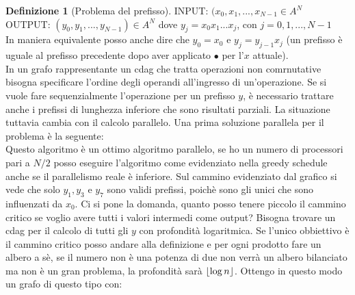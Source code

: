 \documentclass[a4paper,portrait,12pt]{article}
\theoremstyle{definition}
\newtheorem{definition}{Definizione}[section]
\DeclarePairedDelimiter{\floor}{\lfloor}{\rfloor}
\begin{document}
\begin{definition}[Problema del prefisso]
INPUT: $(x_0,x_1,...,x_{N-1} \in A^N$\\
OUTPUT: $(y_0,y_1,...,y_{N-1}) \in A^N$ dove $y_j = x_0x_1...x_j$, con $j=0,1,...,N-1$\\
In maniera equivalente posso anche dire che $y_0 = x_0$ e $y_j = y_{j-1}x_j$ (un prefisso è uguale al prefisso precedente dopo aver applicato $\bullet$ per l'$x$ attuale).\\

In un grafo rappresentante un cdag che tratta operazioni non comrnutative bisogna specificare l’ordine degli operandi all’ingresso di un’operazione.
Se si vuole fare sequenzialmente l’operazione per un prefisso $y$, è necessario trattare anche i prefissi di lunghezza inferiore che sono risultati parziali.
La situazione tuttavia cambia con il calcolo parallelo.
Una prima soluzione parallela per il problema è la seguente:\\

Questo algoritmo è un ottimo algoritmo parallelo, se ho un numero di processori pari a $N/2$ posso eseguire l’algoritmo come evidenziato nella greedy schedule anche se il parallelismo reale è inferiore.
Sul cammino evidenziato dal grafico si vede che solo $y_1,y_3$ e $y_7$ sono validi prefissi, poichè sono gli unici che sono influenzati da $x_0$.
Ci si pone la domanda, quanto posso tenere piccolo il cammino critico se voglio avere tutti i valori
intermedi come output?
Bisogna trovare un cdag per il calcolo di tutti gli $y$ con profondità logaritmica.
Se l’unico obbiettivo è il cammino critico posso andare alla definizione e per ogni prodotto fare un albero a sè, se il numero non è una potenza di due non verrà un albero bilanciato ma non è un gran problema, la profondità sarà $\floor{\log n}$.
Ottengo in questo modo un grafo di questo tipo con:

\end{definition}
\end{document}
